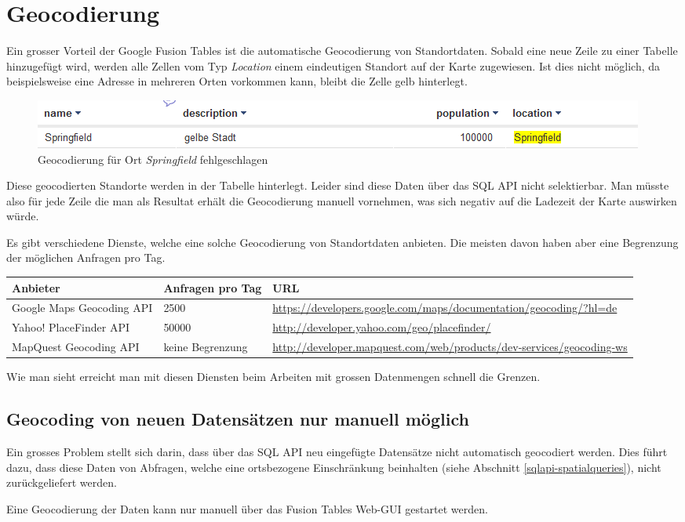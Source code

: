 \section{Geocodierung}
\label{geocodierung}
Ein grosser Vorteil der Google Fusion Tables ist die automatische 
\gls{Geocodierung} von Standortdaten. Sobald eine neue Zeile zu einer Tabelle hinzugefügt wird, werden alle Zellen vom Typ \emph{Location} einem eindeutigen Standort auf der Karte zugewiesen. Ist dies nicht möglich, da beispielsweise eine Adresse in mehreren Orten vorkommen kann, bleibt die Zelle gelb hinterlegt.

 \begin{figure}[!h]
	\centering
	\includegraphics[scale=0.75]{images/einfuehrung/geocoding_failed.png}
	\caption{Geocodierung für Ort \emph{Springfield} fehlgeschlagen}
	\label{geocoding_failed}
\end{figure}

Diese geocodierten Standorte werden in der Tabelle hinterlegt. Leider sind diese Daten über das SQL API nicht selektierbar. Man müsste also für jede Zeile die man als Resultat erhält die Geocodierung manuell vornehmen, was sich negativ auf die Ladezeit der Karte auswirken würde.

Es gibt verschiedene Dienste, welche eine solche Geocodierung von Standortdaten anbieten. Die meisten davon haben aber eine Begrenzung der möglichen Anfragen pro Tag.

\begin{longtable}{|l|p{1.9cm}|p{7.3cm}|}
\hline 
\textbf{Anbieter} & \textbf{Anfragen pro Tag} & \textbf{URL} \\ 
\hline 
Google Maps Geocoding API & 2500 & \url{https://developers.google.com/maps/documentation/geocoding/?hl=de} \\ 
\hline 
Yahoo! PlaceFinder API & 50000 & \url{http://developer.yahoo.com/geo/placefinder/} \\ 
\hline 
MapQuest Geocoding API & keine Begrenzung & \url{http://developer.mapquest.com/web/products/dev-services/geocoding-ws} \\ 
\hline 
\end{longtable} 

Wie man sieht erreicht man mit diesen Diensten beim Arbeiten mit grossen Datenmengen schnell die Grenzen.

\subsection{Geocoding von neuen Datensätzen nur manuell möglich}
\label{geocodierung-bug}
Ein grosses Problem stellt sich darin, dass über das SQL API neu eingefügte Datensätze nicht automatisch geocodiert werden. Dies führt dazu, dass diese Daten von Abfragen, welche eine ortsbezogene Einschränkung beinhalten (siehe Abschnitt \ref{sqlapi-spatialqueries}), nicht zurückgeliefert werden.

Eine Geocodierung der Daten kann nur manuell über das Fusion Tables Web-GUI gestartet werden.